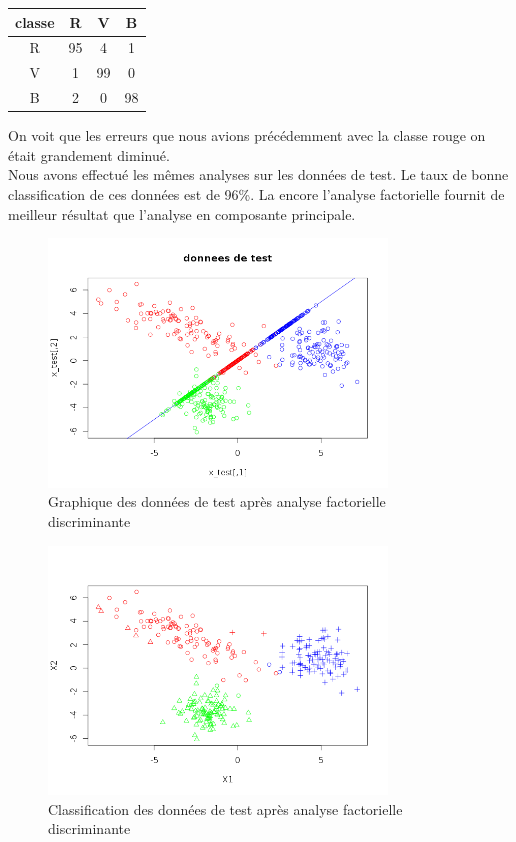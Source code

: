 \documentclass[a4paper,11pt]{article}
\begin{document}
  \begin{center}
  \begin{tabular}{|c|c|c|c|}
   \hline
   classe & R & V & B\\
   \hline
   R & 95 & 4 & 1 \\
   \hline
   V & 1 & 99 & 0 \\
   \hline
   B & 2 & 0 & 98 \\
   \hline
  \end{tabular}
  \end{center}
  
  On voit que les erreurs que nous avions précédemment avec la classe rouge on était grandement
  diminué.\\
  
  Nous avons effectué les mêmes analyses sur les données de test. Le taux de bonne classification de ces 
  données est de 96\%. La encore l'analyse factorielle fournit de meilleur résultat que l'analyse en composante
  principale.\\
  
  \begin{figure}[H]
    \center
   \includegraphics[width=9cm]{test_fact.png}
    \caption{Graphique des données de test après analyse factorielle discriminante}
  \end{figure}
  
   \begin{figure}[H]
    \center
   \includegraphics[width=9cm]{test_fact_class.png}
    \caption{Classification des données de test après analyse factorielle discriminante}
  \end{figure}
  
\end{document}
